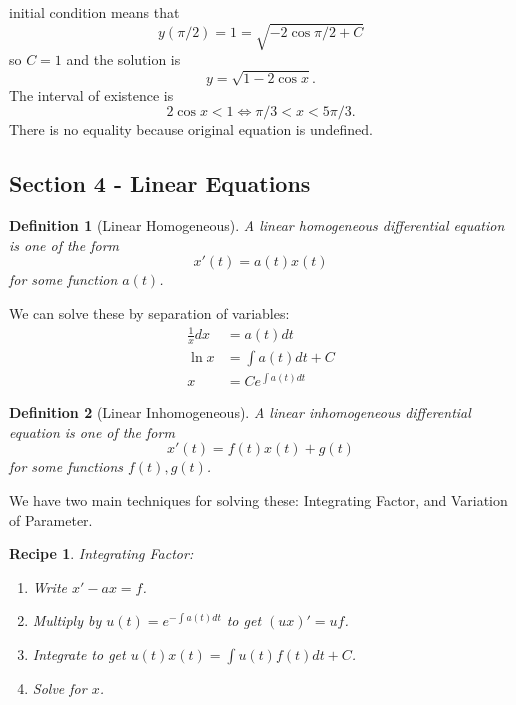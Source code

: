 \documentclass[14pt]{article}
\newtheorem{defn}{Definition}
\newtheorem{re}{Recipe}
\begin{document}
initial condition means that 
\[y(\pi /2 )  = 1 = \sqrt{-2 \cos \pi / 2 + C}\]
so $C =1$ and the solution is 
\[y = \sqrt{1 - 2 \cos x}.\]
The interval of existence is 
\[2 \cos x < 1 \Leftrightarrow \pi / 3 < x < 5 \pi /3 .\]
There is no equality because original equation is undefined.

\subsection{Section 4 - Linear Equations}

\begin{defn}[Linear Homogeneous] A \emph{linear homogeneous} differential equation is one of the form \[x'(t) = a(t) x(t) \] for some function $a(t)$. \end{defn}

We can solve these by separation of variables:
\begin{align*} 
\frac{1}{x} dx &= a(t) dt \\ 
\ln x &= \int a(t) dt + C \\
x &= C e^{\int a(t) dt}
\end{align*}

\begin{defn}[Linear Inhomogeneous] A \emph{linear inhomogeneous} differential equation is one of the form \[x'(t) = f(t) x(t) + g(t) \] for some functions $f(t), g(t)$. \end{defn}

We have two main techniques for solving these: Integrating Factor, and Variation of Parameter.

\begin{re} Integrating Factor:
\begin{enumerate} 
\item Write $x' - ax = f$.
\item Multiply by $u(t) = e^{- \int a(t) dt}$ to get $ (u x)' = uf $.
\item Integrate to get $u(t) x(t) = \int u(t) f(t) dt + C $.
\item Solve for $x$.
\end{enumerate}
\end{re}
\end{document}
